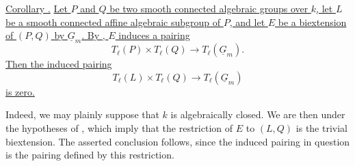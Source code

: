 \medskip
\noindent\underline{Corollary .}  \underline{Let $P$ and $Q$ be
two smooth connected algebraic groups over $k$, let $L$ be a smooth
connected affine algebraic subgroup of $P$, and let $E$ be a
biextension of $(P,Q)$ by $\underline G_m$.  By , $E$ induces a
pairing}
\[
 T_\ell(P)\times T_\ell(Q)\longrightarrow T_\ell(\underline G_m).
\]
\underline{Then the induced pairing}
\[
 T_\ell(L)\times T_\ell(Q)\longrightarrow T_\ell(\underline G_m)
\]
\underline{is zero.}

Indeed, we may plainly suppose that $k$ is algebraically closed.  We
are then under the hypotheses of , which imply that the
restriction of $E$ to $(L,Q)$ is the trivial biextension.  The
asserted conclusion follows, since the induced pairing in question
is the pairing defined by this restriction.
